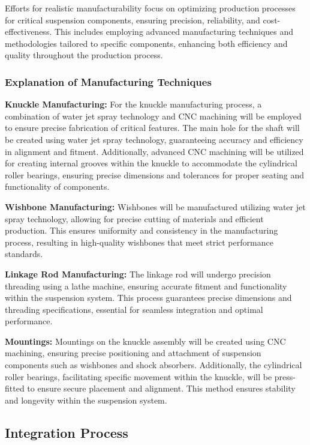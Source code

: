 Efforts for realistic manufacturability focus on optimizing production processes for critical suspension components, ensuring precision, reliability, and cost-effectiveness. This includes employing advanced manufacturing techniques and methodologies tailored to specific components, enhancing both efficiency and quality throughout the production process.

\subsubsection{Explanation of Manufacturing Techniques}


\textbf{Knuckle Manufacturing:} For the knuckle manufacturing process, a combination of water jet spray technology and CNC machining will be employed to ensure precise fabrication of critical features. The main hole for the shaft will be created using water jet spray technology, guaranteeing accuracy and efficiency in alignment and fitment. Additionally, advanced CNC machining will be utilized for creating internal grooves within the knuckle to accommodate the cylindrical roller bearings, ensuring precise dimensions and tolerances for proper seating and functionality of components.

\textbf{Wishbone Manufacturing:} Wishbones will be manufactured utilizing water jet spray technology, allowing for precise cutting of materials and efficient production. This ensures uniformity and consistency in the manufacturing process, resulting in high-quality wishbones that meet strict performance standards.

\textbf{Linkage Rod Manufacturing:} The linkage rod will undergo precision threading using a lathe machine, ensuring accurate fitment and functionality within the suspension system. This process guarantees precise dimensions and threading specifications, essential for seamless integration and optimal performance.

\textbf{Mountings:} Mountings on the knuckle assembly will be created using CNC machining, ensuring precise positioning and attachment of suspension components such as wishbones and shock absorbers. Additionally, the cylindrical roller bearings, facilitating specific movement within the knuckle, will be press-fitted to ensure secure placement and alignment. This method ensures stability and longevity within the suspension system.

\subsection{Integration Process}
